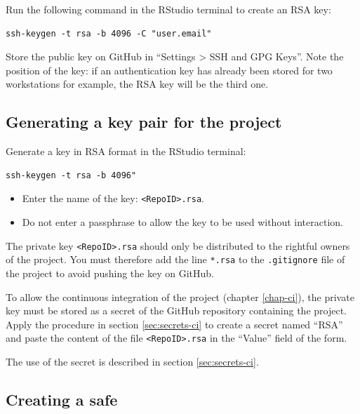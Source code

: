 \documentclass[
  12pt,
  american,
  a4paper,
  extrafontsizes,onecolumn,openright
  ]{memoir}
\providecommand{\tightlist}{%
  \setlength{\itemsep}{0pt}\setlength{\parskip}{0pt}}
\begin{document}
Run the following command in the RStudio terminal to create an RSA key:

\begin{verbatim}
ssh-keygen -t rsa -b 4096 -C "user.email"
\end{verbatim}

Store the public key on GitHub in \enquote{Settings \textgreater{} SSH and GPG Keys}.
Note the position of the key: if an authentication key has already been stored for two workstations for example, the RSA key will be the third one.

\hypertarget{generating-a-key-pair-for-the-project}{%
\subsection{Generating a key pair for the project}\label{generating-a-key-pair-for-the-project}}

Generate a key in RSA format in the RStudio terminal:

\begin{verbatim}
ssh-keygen -t rsa -b 4096" 
\end{verbatim}

\begin{itemize}
\tightlist
\item
  Enter the name of the key: \texttt{\textless{}RepoID\textgreater{}.rsa}.
\item
  Do not enter a passphrase to allow the key to be used without interaction.
\end{itemize}

The private key \texttt{\textless{}RepoID\textgreater{}.rsa} should only be distributed to the rightful owners of the project.
You must therefore add the line \texttt{*.rsa} to the \texttt{.gitignore} file of the project to avoid pushing the key on GitHub.

To allow the continuous integration of the project (chapter \ref{chap-ci}), the private key must be stored as a secret of the GitHub repository containing the project.
Apply the procedure in section \ref{sec:secrets-ci} to create a secret named \enquote{RSA} and paste the content of the file \texttt{\textless{}RepoID\textgreater{}.rsa} in the \enquote{Value} field of the form.

The use of the secret is described in section \ref{sec:secrets-ci}.

\hypertarget{creating-a-safe}{%
\subsection{Creating a safe}\label{creating-a-safe}}
\end{document}
